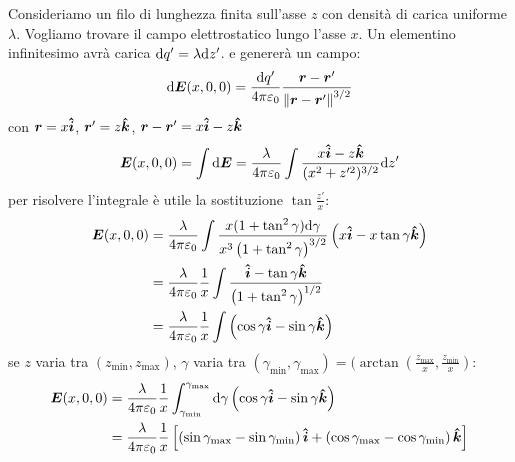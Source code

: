 \begin{Es}
 Consideriamo un filo di lunghezza finita sull'asse $z$ con densità di carica uniforme $\lambda$. Vogliamo trovare il campo elettrostatico lungo l'asse $x$. Un elementino infinitesimo avrà carica $\mathrm{d} q'=\lambda\mathrm{d} z'$. e genererà un campo:
\begin{equation*}
 \mathrm{d}\boldsymbol{E}(x,0,0) = \frac{\mathrm{d} q'}{4\pi\varepsilon_0}\frac{\boldsymbol{r}-\boldsymbol{r}'}{\left\lVert\boldsymbol{r}-\boldsymbol{r}'\right\rVert^{3/2}}
\end{equation*}
con $\boldsymbol{r}=x\boldsymbol{\hat {i}}$, $\boldsymbol{r}'=z\boldsymbol{\hat {k}}$, $\boldsymbol{r}-\boldsymbol{r}'=x\boldsymbol{\hat {i}}-z \boldsymbol{\hat {k}}$
\begin{equation*}
 \boldsymbol{E}(x,0,0)=\int\mathrm{d} \boldsymbol{E}=\frac{\lambda}{4\pi\varepsilon_0}\int\frac{x\boldsymbol{\hat {i}}-z\boldsymbol{\hat {k}}}{(x^2+z'^2)^{3/2}}\mathrm{d} z'
\end{equation*}
per risolvere l'integrale è utile la sostituzione $\tan\frac{z'}{x}$:
\begin{align*}
 \boldsymbol{E}(x,0,0)&=\frac{\lambda}{4\pi\varepsilon_0}\int\frac{x(1+\tan^2\gamma)\mathrm{d}\gamma}{x^3\left(1+\tan^2\gamma\right)^{3/2}}\left(x\boldsymbol{\hat {i}}-x\tan\gamma\boldsymbol{\hat {k}}\right)\\
&=\frac{\lambda}{4\pi\varepsilon_0}\frac{1}{x}\int\frac{\boldsymbol{\hat {i}}-\tan\gamma\boldsymbol{\hat {k}}}{\left(1+\tan^2\gamma\right)^{1/2}}\\
&=\frac{\lambda}{4\pi\varepsilon_0}\frac{1}{x}\int\left(\cos\gamma\boldsymbol{\hat {i}}-\sin\gamma\boldsymbol{\hat {k}}\right)
\end{align*}
se $z$ varia tra $(z_\text{min},z_\text{max})$, $\gamma$ varia tra $(\gamma_\text{min},\gamma_\text{max})=(\arctan\left(\frac{z_\text{max}}{x},\frac{z_\text{min}}{x}\right)$:
\begin{align*}
 \boldsymbol{E}(x,0,0)&=\frac{\lambda}{4\pi\varepsilon_0}\frac{1}{x}\int_{\gamma_{\text{min}}}^{\gamma_{\text{max}}}\mathrm{d}\gamma\left(\cos\gamma\boldsymbol{\hat {i}}-\sin\gamma\boldsymbol{\hat {k}}\right)\\
&=\frac{\lambda}{4\pi\varepsilon_0}\frac{1}{x}\left[\left(\sin\gamma_\text{max}-\sin\gamma_\text{min}\right)\boldsymbol{\hat {i}}+\left(\cos\gamma_\text{max}-\cos\gamma_\text{min}\right)\boldsymbol{\hat {k}}\right]
\end{align*}



\end{Es}


